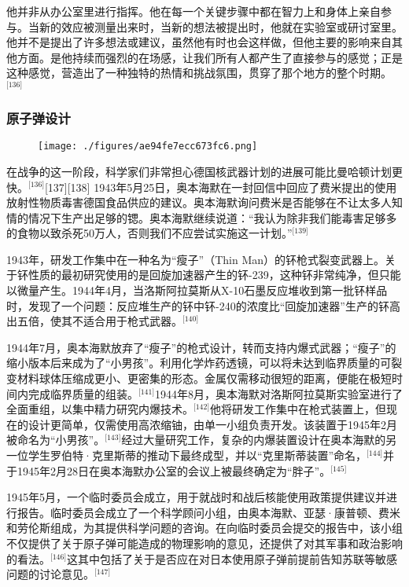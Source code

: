 他并非从办公室里进行指挥。他在每一个关键步骤中都在智力上和身体上亲自参与。当新的效应被测量出来时，当新的想法被提出时，他就在实验室或研讨室里。他并不是提出了许多想法或建议，虽然他有时也会这样做，但他主要的影响来自其他方面。是他持续而强烈的在场感，让我们所有人都产生了直接参与的感觉；正是这种感觉，营造出了一种独特的热情和挑战氛围，贯穿了那个地方的整个时期。\(^\text{[136]}\)
\subsubsection{原子弹设计}
\begin{figure}[ht]
\centering
\texttt{[image: ./figures/ae94fe7ecc673fc6.png]}
\caption{} \label{fig_ABHM_6}
\end{figure}
在战争的这一阶段，科学家们非常担心德国核武器计划的进展可能比曼哈顿计划更快。\(^\text{[136]}\)[137][138] 1943年5月25日，奥本海默在一封回信中回应了费米提出的使用放射性物质毒害德国食品供应的建议。奥本海默询问费米是否能够在不让太多人知情的情况下生产出足够的锶。奥本海默继续说道：“我认为除非我们能毒害足够多的食物以致杀死50万人，否则我们不应尝试实施这一计划。”\(^\text{[139]}\)

1943年，研发工作集中在一种名为“瘦子”（Thin Man）的钚枪式裂变武器上。关于钚性质的最初研究使用的是回旋加速器产生的钚-239，这种钚非常纯净，但只能以微量产生。1944年4月，当洛斯阿拉莫斯从X-10石墨反应堆收到第一批钚样品时，发现了一个问题：反应堆生产的钚中钚-240的浓度比“回旋加速器”生产的钚高出五倍，使其不适合用于枪式武器。\(^\text{[140]}\)

1944年7月，奥本海默放弃了“瘦子”的枪式设计，转而支持内爆式武器；“瘦子”的缩小版本后来成为了“小男孩”。利用化学炸药透镜，可以将未达到临界质量的可裂变材料球体压缩成更小、更密集的形态。金属仅需移动很短的距离，便能在极短时间内完成临界质量的组装。\(^\text{[141]}\)1944年8月，奥本海默对洛斯阿拉莫斯实验室进行了全面重组，以集中精力研究内爆技术。\(^\text{[142]}\)他将研发工作集中在枪式装置上，但现在的设计更简单，仅需使用高浓缩铀，由单一小组负责开发。该装置于1945年2月被命名为“小男孩”。\(^\text{[143]}\)经过大量研究工作，复杂的内爆装置设计在奥本海默的另一位学生罗伯特·克里斯蒂的推动下最终成型，并以“克里斯蒂装置”命名，\(^\text{[144]}\)并于1945年2月28日在奥本海默办公室的会议上被最终确定为“胖子”。\(^\text{[145]}\)

1945年5月，一个临时委员会成立，用于就战时和战后核能使用政策提供建议并进行报告。临时委员会成立了一个科学顾问小组，由奥本海默、亚瑟·康普顿、费米和劳伦斯组成，为其提供科学问题的咨询。在向临时委员会提交的报告中，该小组不仅提供了关于原子弹可能造成的物理影响的意见，还提供了对其军事和政治影响的看法。\(^\text{[146]}\)这其中包括了关于是否应在对日本使用原子弹前提前告知苏联等敏感问题的讨论意见。\(^\text{[147]}\)
